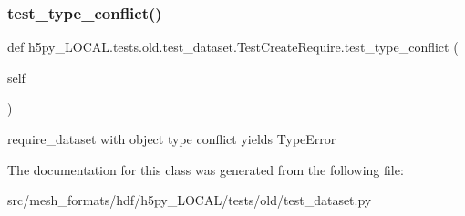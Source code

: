 \subsubsection{\texorpdfstring{test\+\_\+type\+\_\+conflict()}{test\_type\_conflict()}}
{\footnotesize\ttfamily def h5py\+\_\+\+L\+O\+C\+A\+L.\+tests.\+old.\+test\+\_\+dataset.\+Test\+Create\+Require.\+test\+\_\+type\+\_\+conflict (\begin{DoxyParamCaption}\item[{}]{self }\end{DoxyParamCaption})}

\begin{DoxyVerb}require_dataset with object type conflict yields TypeError \end{DoxyVerb}
 

The documentation for this class was generated from the following file\+:\begin{DoxyCompactItemize}
\item 
src/mesh\+\_\+formats/hdf/h5py\+\_\+\+L\+O\+C\+A\+L/tests/old/test\+\_\+dataset.\+py\end{DoxyCompactItemize}
